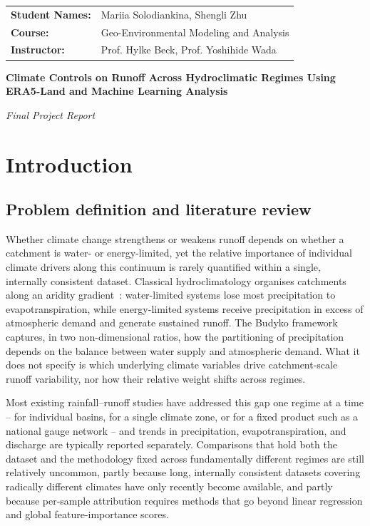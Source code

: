 \documentclass[11pt]{article}
\begin{document}
\noindent
\begin{tabular}{ll}
\textbf{Student Names:} & Mariia Solodiankina, Shengli Zhu \\
\textbf{Course:} & Geo-Environmental Modeling and Analysis \\
\textbf{Instructor:} & Prof. Hylke Beck, Prof. Yoshihide Wada \\
\end{tabular}

\vspace{0.6cm}

\begin{center}
{\Large \textbf{Climate Controls on Runoff Across Hydroclimatic Regimes Using ERA5-Land and Machine Learning Analysis}}

\vspace{0.2cm}
\textit{Final Project Report}  
\end{center}

\vspace{0.4cm}

\section{Introduction}

\subsection{Problem definition and literature review}

Whether climate change strengthens or weakens runoff depends on whether a catchment is water- or energy-limited, yet the relative importance of individual climate drivers along this continuum is rarely quantified within a single, internally consistent dataset. Classical hydroclimatology organises catchments along an aridity gradient~\cite{budyko1974}: water-limited systems lose most precipitation to evapotranspiration, while energy-limited systems receive precipitation in excess of atmospheric demand and generate sustained runoff. The Budyko framework captures, in two non-dimensional ratios, how the partitioning of precipitation depends on the balance between water supply and atmospheric demand. What it does not specify is which underlying climate variables drive catchment-scale runoff variability, nor how their relative weight shifts across regimes.

Most existing rainfall--runoff studies have addressed this gap one regime at a time -- for individual basins, for a single climate zone, or for a fixed product such as a national gauge network -- and trends in precipitation, evapotranspiration, and discharge are typically reported separately. Comparisons that hold both the dataset and the methodology fixed across fundamentally different regimes are still relatively uncommon, partly because long, internally consistent datasets covering radically different climates have only recently become available, and partly because per-sample attribution requires methods that go beyond linear regression and global feature-importance scores.
\end{document}
